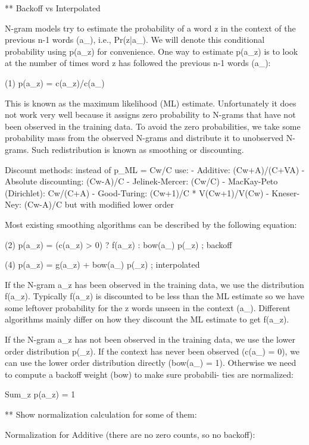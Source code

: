 ** Backoff vs Interpolated

       N-gram models try to estimate the probability of a word z in the context of the  previous  n-1  words
       (a_), i.e., Pr(z|a_).  We will denote this conditional probability using p(a_z) for convenience.  One
       way to estimate p(a_z) is to look at the number of times word z has followed the previous  n-1  words
       (a_):

       (1)  p(a_z) = c(a_z)/c(a_)

       This  is  known  as  the  maximum likelihood (ML) estimate.  Unfortunately it does not work very well
       because it assigns zero probability to N-grams that have not been observed in the training data.   To
       avoid  the zero probabilities, we take some probability mass from the observed N-grams and distribute
       it to unobserved N-grams.  Such redistribution is known as smoothing or discounting.


Discount methods: instead of p_ML = Cw/C use:
- Additive: (Cw+A)/(C+VA)
- Absolute discounting: (Cw-A)/C
- Jelinek-Mercer: \lambda * (Cw/C)
- MacKay-Peto (Dirichlet): Cw/(C+A)
- Good-Turing: (Cw+1)/C * V(Cw+1)/V(Cw)
- Kneser-Ney: (Cw-A)/C but with modified lower order


       Most existing smoothing algorithms can be described by the following equation:

       (2)  p(a_z) = (c(a_z) > 0) ? f(a_z) : bow(a_) p(_z)   ; backoff

       (4)  p(a_z) = g(a_z) + bow(a_) p(_z)   ; interpolated

       If the N-gram a_z has been observed in the training data, we use the distribution f(a_z).   Typically
       f(a_z)  is  discounted to be less than the ML estimate so we have some leftover probability for the z
       words unseen in the context (a_).  Different algorithms mainly differ on how  they  discount  the  ML
       estimate to get f(a_z).

       If  the  N-gram  a_z  has not been observed in the training data, we use the lower order distribution
       p(_z).  If the context has never been observed (c(a_) = 0), we can use the lower  order  distribution
       directly  (bow(a_) = 1).  Otherwise we need to compute a backoff weight (bow) to make sure probabili-
       ties are normalized:

            Sum_z p(a_z) = 1


** Show normalization calculation for some of them:

Normalization for Additive (there are no zero counts, so no backoff):
    
